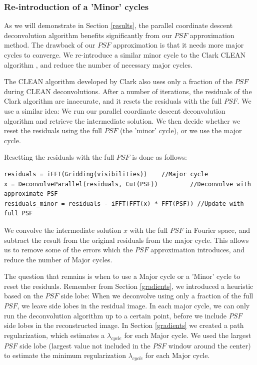 \subsubsection{Re-introduction of a 'Minor' cycles}
As we will demonstrate in Section \ref{results}, the parallel coordinate descent deconvolution algorithm benefits significantly from our $PSF$ approximation method. The drawback of our $PSF$ approximation is that it needs more major cycles to converge. We re-introduce a similar minor cycle to the Clark CLEAN algorithm \cite{clark1980efficient}, and reduce the number of necessary major cycles.

The CLEAN algorithm developed by Clark also uses only a fraction of the $PSF$ during CLEAN deconvolutions. After a number of iterations, the residuals of the Clark algorithm are inaccurate, and it resets the residuals with the full $PSF$. We use a similar idea: We run our parallel coordinate descent deconvolution algorithm and retrieve the intermediate solution. We then decide whether we reset the residuals using the full $PSF$ (the 'minor' cycle), or we use the major cycle.

Resetting the residuals with the full $PSF$ is done as follows:
\begin{lstlisting}
residuals = iFFT(Gridding(visibilities))  	//Major cycle
x = DeconvolveParallel(residuals, Cut(PSF)) 		//Deconvolve with approximate PSF
residuals_minor = residuals - iFFT(FFT(x) * FFT(PSF)) //Update with full PSF
\end{lstlisting}

We convolve the intermediate solution $x$ with the full $PSF$ in Fourier space, and subtract the result from the original residuals from the major cycle. This allows us to remove some of the errors which the $PSF$ approximation introduces, and reduce the number of Major cycles.

The question that remains is when to use a Major cycle or a 'Minor' cycle to reset the residuals. Remember from Section \ref{gradients}, we introduced a heuristic based on the $PSF$ side lobe: When we deconvolve using only a fraction of the full $PSF$, we leave side lobes in the residual image. In each major cycle, we can only run the deconvolution algorithm up to a certain point, before we include $PSF$ side lobes in the reconstructed image. In Section \ref{gradients} we created a path regularization, which estimates a $\lambda_{cycle}$ for each Major cycle. We used the largest $PSF$ side lobe (largest value not included in the $PSF$ window around the center) to estimate the minimum regularization $\lambda_{cycle}$ for each Major cycle.

